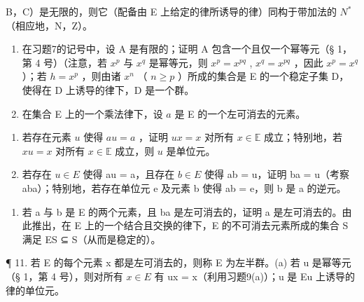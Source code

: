 B，C）是无限的，则它（配备由 E 上给定的律所诱导的律）同构于带加法的 \(N^{*}\) （相应地，N，Z）。

\begin{enumerate}
\def\labelenumi{\arabic{enumi}.}
\setcounter{enumi}{7}
\item
  在习题7的记号中，设 A 是有限的；证明 A 包含一个且仅一个幂等元（§ 1，第 4 号）（注意，若 \(x^p\) 与 \(x^q\) 是幂等元，则 \(x^p = x^{pq}\) , \(x^q = x^{pq}\) ，因此 \(x^p = x^q\) ）；若 \(h = x^p\) ，则由诸 \(x^n\) （ \(n \geqslant p\) ）所成的集合是 E 的一个稳定子集 D，使得在 D 上诱导的律下，D 是一个群。
\item
  在集合 E 上的一个乘法律下，设 \(a\) 是 E 的一个左可消去的元素。
\end{enumerate}

\begin{enumerate}
\def\labelenumi{(\alph{enumi})}
\item
  若存在元素 \(u\) 使得 \(au = a\) ，证明 \(ux = x\) 对所有 \(x \in \mathbb{E}\) 成立；特别地，若 \(xu = x\) 对所有 \(x \in \mathbb{E}\) 成立，则 \(u\) 是单位元。
\item
  若存在 \(u \in E\) 使得 au = a，且存在 \(b \in E\) 使得 ab = u，证明 ba = u（考察 aba）；特别地，若存在单位元 e 及元素 b 使得 ab = e，则 b 是 a 的逆元。
\end{enumerate}

\begin{enumerate}
\def\labelenumi{\arabic{enumi}.}
\setcounter{enumi}{9}
\tightlist
\item
  若 a 与 b 是 E 的两个元素，且 ba 是左可消去的，证明 a 是左可消去的。由此推出，在 E 上的一个结合且交换的律下，E 的不可消去元素所成的集合 S 满足 ES ⊆ S（从而是稳定的）。
\end{enumerate}

¶ 11. 若 E 的每个元素 x 都是左可消去的，则称 E 为左半群。(a) 若 u 是幂等元（§ 1，第 4 号），则对所有 \(x \in E\) 有 ux = x（利用习题9(a)）；u 是 Eu 上诱导的律的单位元。

